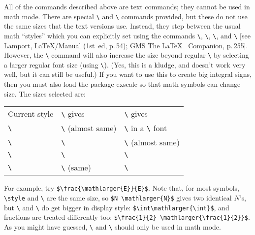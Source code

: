 \documentclass[pagesize=auto]{scrartcl}
\makeatletter
\newcommand*{\pkg}[1]{\textsf{#1}}
\newcommand*{\cs}[1]{\texttt{\textbackslash#1}}
\newcommand*{\cmd}[1]{\cs{\expandafter\@gobble\string#1}}
\makeatother
\begin{document}
\enlargethispage{-5\baselineskip}

All of the commands described above are text commands; they cannot be used
in math mode.  There are special \cmd{\mathsmaller} and \cmd{\mathlarger} commands
provided, but these do not use the same sizes that the text versions use.
Instead, they step between the usual math ``styles'' which you can explicitly
set using the commands \cmd{\displaystyle}, \cmd{\textstyle}, \cmd{\scriptstyle}, and
\cmd{\scriptscriptstyle} [see Lamport, \LaTeX/Manual (1st~ed, p.\,54); GMS The \LaTeX\ %
Companion, p.\,255]\@.  However, the \cmd{\mathlarger} command will also increase the
size beyond regular \cmd{\displaystyle} by selecting a larger regular font size
(using \cmd{\larger})\@.  (Yes, this is a kludge, and doesn't work very well, but 
it can still be useful.)  If you want to use this to create big integral 
signs, then you must also load the package \pkg{exscale} so that math symbols
can change size.  The sizes selected are:
%
\begin{flushleft}
  \small
  \begin{tabular}{@{}lll@{}}
    \toprule
    Current style            & \cmd{\mathsmaller} gives        & \cmd{\mathlarger} gives                     \\
    \cmidrule(r){1-1} \cmidrule(lr){2-2} \cmidrule(l){3-3}
    \cmd{\displaystyle}      & \cmd{\textstyle} (almost same)  & \cmd{\displaystyle} in a \cmd{\larger} font \\
    \cmd{\textstyle}         & \cmd{\scriptstyle}              & \cmd{\displaystyle} (almost same)           \\
    \cmd{\scriptstyle}       & \cmd{\scriptscriptstyle}        & \cmd{\textstyle}                            \\
    \cmd{\scriptscriptstyle} & \cmd{\scriptscriptstyle} (same) & \cmd{\scriptstyle}                          \\
    \bottomrule
  \end{tabular}
\end{flushleft}
%
For example, try \verb+$\frac{\mathlarger{E}}{E}$+.  Note that, for most symbols,
\cmd{\display\-style} and \cmd{\textstyle} are the same size, so \verb+$N \mathlarger{N}$+
gives two identical $N$'s, but \cmd{\sum} and \cmd{\int} do get bigger in display style: 
\verb+$\int\mathlarger{\int}$+, and fractions are treated differently too: 
\verb+$\frac{1}{2} \mathlarger{\frac{1}{2}}$+.  As you might have guessed, 
\cmd{\mathlarger} and \cmd{\mathsmaller} should only be used in math mode.
\end{document}
